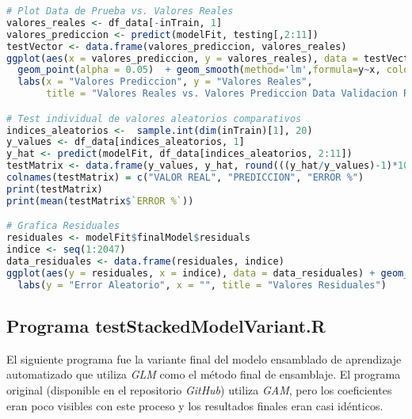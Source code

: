 \begin{lstlisting}[language=R]
# Plot Data de Prueba vs. Valores Reales
valores_reales <- df_data[-inTrain, 1]
valores_prediccion <- predict(modelFit, testing[,2:11])
testVector <- data.frame(valores_prediccion, valores_reales)
ggplot(aes(x = valores_prediccion, y = valores_reales), data = testVector) +
  geom_point(alpha = 0.05)  + geom_smooth(method='lm',formula=y~x, colour = "yellow") +
  labs(x = "Valores Prediccion", y = "Valores Reales",
       title = "Valores Reales vs. Valores Prediccion Data Validacion Regresion Multivariable")

# Test individual de valores aleatorios comparativos
indices_aleatorios <-  sample.int(dim(inTrain)[1], 20)
y_values <- df_data[indices_aleatorios, 1]
y_hat <- predict(modelFit, df_data[indices_aleatorios, 2:11])
testMatrix <- data.frame(y_values, y_hat, round(((y_hat/y_values)-1)*100,1))
colnames(testMatrix) = c("VALOR REAL", "PREDICCION", "ERROR %")
print(testMatrix)
print(mean(testMatrix$`ERROR %`))

# Grafica Residuales
residuales <- modelFit$finalModel$residuals
indice <- seq(1:2047)
data_residuales <- data.frame(residuales, indice)
ggplot(aes(y = residuales, x = indice), data = data_residuales) + geom_jitter(alpha = 1/05) +
  labs(y = "Error Aleatorio", x = "", title = "Valores Residuales")
\end{lstlisting}

\subsection{Programa testStackedModelVariant.R}
El siguiente programa fue la variante final del modelo ensamblado de aprendizaje automatizado que utiliza \emph{GLM} como el método final de ensamblaje. El programa original (disponible en el repositorio \emph{GitHub}) utiliza \emph{GAM}, pero los coeficientes eran poco visibles con este proceso y los resultados finales eran casi idénticos.


